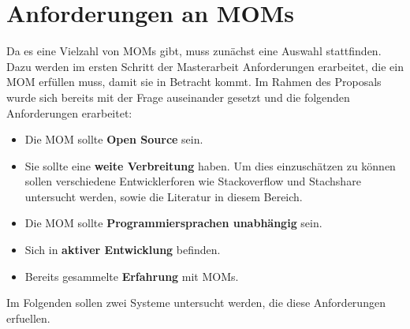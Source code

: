 \section{Anforderungen an MOMs}
\label{sec:anforderungenMom}
Da es eine Vielzahl von MOMs gibt, muss zunächst eine Auswahl stattfinden. Dazu werden im ersten Schritt der Masterarbeit Anforderungen erarbeitet, die ein MOM erfüllen muss, damit sie in Betracht kommt. Im Rahmen des Proposals wurde sich bereits mit der Frage auseinander gesetzt und die folgenden Anforderungen erarbeitet:
\begin{itemize}
\item Die MOM sollte \textbf{Open Source} sein.
\item Sie sollte eine \textbf{weite Verbreitung} haben. Um dies einzuschätzen zu können sollen verschiedene Entwicklerforen wie Stackoverflow und Stachshare untersucht werden, sowie die Literatur in diesem Bereich.
\item %
Die MOM sollte \textbf{Programmiersprachen unabhängig} sein.
\item Sich in \textbf{aktiver Entwicklung} befinden.
\item Bereits gesammelte \textbf{Erfahrung} mit MOMs.
\end{itemize}

Im Folgenden sollen zwei Systeme untersucht werden, die diese Anforderungen erfuellen.

